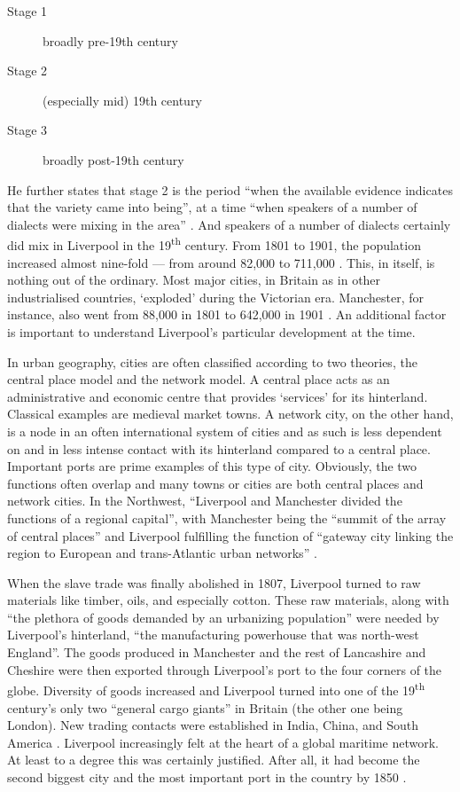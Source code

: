 	\begin{description}
		\item[Stage 1] broadly pre-19th century
		\item[Stage 2] (especially mid) 19th century
		\item[Stage 3] broadly post-19th century
	\end{description}

He further states that stage 2 is the period ``when the available evidence indicates that the variety came into being'', at a time ``when speakers of a number of dialects were mixing in the area'' \citeyearpar[106--107]{honeybone2007}.
And speakers of a number of dialects certainly did mix in Liverpool in the 19\textsuperscript{th} century.
From 1801 to 1901, the population increased almost nine-fold --- from around 82,000 to 711,000 \parencite{gbhistgis}.
This, in itself, is nothing out of the ordinary.
Most major cities, in Britain as in other industrialised countries, \enquote*{exploded} during the Victorian era.
Manchester, for instance, also went from 88,000 in 1801 to 642,000 in 1901 \parencite{gbhistgis}.
An additional factor is important to understand Liverpool's particular development at the time.

In urban geography, cities are often classified according to two theories, the central place model and the network model.
A central place acts as an administrative and economic centre that provides `services' for its hinterland. Classical examples are medieval market towns.
A network city, on the other hand, is a node in an often international system of cities and as such is less dependent on and in less intense contact with its hinterland compared to a central place.
Important ports are prime examples of this type of city.
Obviously, the two functions often overlap and many towns or cities are both central places and network cities.
In the Northwest, ``Liverpool and Manchester divided the functions of a regional capital'', with Manchester being the ``summit of the array of central places'' and Liverpool fulfilling the function of ``gateway city linking the region to European and trans-Atlantic urban networks'' \citep[188--189]{hohenberglees1985}.

When the slave trade was finally abolished in 1807, Liverpool turned to raw materials like timber, oils, and especially cotton.
These raw materials, along with ``the plethora of goods demanded by an urbanizing population'' were needed by Liverpool's hinterland, ``the manufacturing powerhouse that was north-west England''.
The goods produced in Manchester and the rest of Lancashire and Cheshire were then exported through Liverpool's port to the four corners of the globe.
Diversity of goods increased and Liverpool turned into one of the 19\textsuperscript{th} century's only two ``general cargo giants'' in Britain (the other one being London).
New trading contacts were established in India, China, and South America \citep[cf.][258--259]{milne2006}.
Liverpool increasingly felt at the heart of a global maritime network.
At least to a degree this was certainly justified.
After all, it had become the second biggest city and the most important port in the country by 1850 \citep[cf.][113--114]{honeybone2007}.

